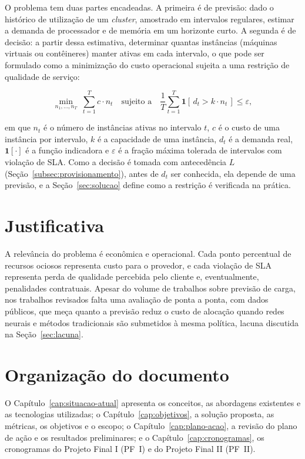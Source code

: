 O problema tem duas partes encadeadas. A primeira é de previsão: dado o histórico de utilização de um \textit{cluster}, amostrado em intervalos regulares, estimar a demanda de processador e de memória em um horizonte curto. A segunda é de decisão: a partir dessa estimativa, determinar quantas instâncias (máquinas virtuais ou contêineres) manter ativas em cada intervalo, o que pode ser formulado como a minimização do custo operacional sujeita a uma restrição de qualidade de serviço:

\begin{equation}
\label{eq:problema}
\min_{n_1, \dots, n_T} \; \sum_{t=1}^{T} c \cdot n_t
\quad \text{sujeito a} \quad
\frac{1}{T} \sum_{t=1}^{T} \mathbf{1}\left[\, d_t > k \cdot n_t \,\right] \leq \varepsilon,
\end{equation}

\noindent em que $n_t$ é o número de instâncias ativas no intervalo $t$, $c$ é o custo de uma instância por intervalo, $k$ é a capacidade de uma instância, $d_t$ é a demanda real, $\mathbf{1}[\cdot]$ é a função indicadora e $\varepsilon$ é a fração máxima tolerada de intervalos com violação de SLA. Como a decisão é tomada com antecedência $L$ (Seção~\ref{subsec:provisionamento}), antes de $d_t$ ser conhecida, ela depende de uma previsão, e a Seção~\ref{sec:solucao} define como a restrição é verificada na prática.

\section{Justificativa}
\label{sec:justificativa}

A relevância do problema é econômica e operacional. Cada ponto percentual de recursos ociosos representa custo para o provedor, e cada violação de SLA representa perda de qualidade percebida pelo cliente e, eventualmente, penalidades contratuais. Apesar do volume de trabalhos sobre previsão de carga, nos trabalhos revisados falta uma avaliação de ponta a ponta, com dados públicos, que meça quanto a previsão reduz o custo de alocação quando redes neurais e métodos tradicionais são submetidos à mesma política, lacuna discutida na Seção~\ref{sec:lacuna}.

\section{Organização do documento}
\label{sec:organizacao}

O Capítulo~\ref{cap:situacao-atual} apresenta os conceitos, as abordagens existentes e as tecnologias utilizadas; o Capítulo~\ref{cap:objetivos}, a solução proposta, as métricas, os objetivos e o escopo; o Capítulo~\ref{cap:plano-acao}, a revisão do plano de ação e os resultados preliminares; e o Capítulo~\ref{cap:cronogramas}, os cronogramas do Projeto Final I (PF~I) e do Projeto Final II (PF~II).